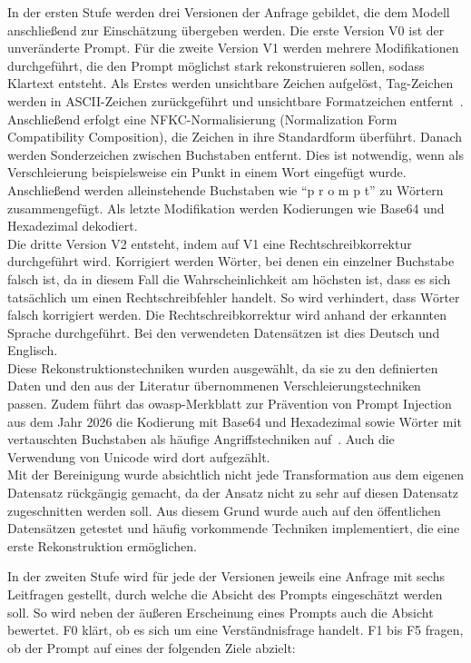 In der ersten Stufe werden drei Versionen der Anfrage gebildet, die dem Modell anschließend zur Einschätzung übergeben werden. Die erste Version V0 ist der
unveränderte Prompt. Für die zweite Version V1 werden mehrere Modifikationen durchgeführt, die den Prompt möglichst stark rekonstruieren sollen, sodass Klartext 
entsteht. Als Erstes werden unsichtbare Zeichen aufgelöst, Tag-Zeichen werden in ASCII-Zeichen zurückgeführt und unsichtbare Formatzeichen entfernt~\cite{sm42}.
Anschließend erfolgt eine NFKC-Normalisierung (Normalization Form Compatibility Composition), die Zeichen in ihre Standardform überführt. Danach werden Sonderzeichen zwischen
Buchstaben entfernt. Dies ist notwendig, wenn als Verschleierung beispielsweise ein Punkt in einem Wort eingefügt wurde. Anschließend werden alleinstehende
Buchstaben wie \enquote{p r o m p t} zu Wörtern zusammengefügt. Als letzte Modifikation werden Kodierungen wie Base64 und Hexadezimal dekodiert. \\
Die dritte Version V2 entsteht, indem auf V1 eine Rechtschreibkorrektur durchgeführt wird. Korrigiert werden Wörter, bei denen ein einzelner Buchstabe falsch ist, da
in diesem Fall die Wahrscheinlichkeit am höchsten ist, dass es sich tatsächlich um einen Rechtschreibfehler handelt. So wird verhindert, dass Wörter falsch korrigiert
werden. Die Rechtschreibkorrektur wird anhand der erkannten Sprache durchgeführt. Bei den verwendeten Datensätzen ist
dies Deutsch und Englisch. \\
Diese Rekonstruktionstechniken wurden ausgewählt, da sie zu den definierten Daten und den aus der Literatur übernommenen Verschleierungstechniken passen. Zudem 
führt das \ac{owasp}-Merkblatt zur Prävention von Prompt Injection aus dem Jahr 2026 die Kodierung mit Base64 und Hexadezimal sowie Wörter mit vertauschten Buchstaben
als häufige Angriffstechniken auf~\cite{sm42}. Auch die Verwendung von Unicode wird dort aufgezählt. \\
Mit der Bereinigung wurde absichtlich nicht jede Transformation aus dem eigenen Datensatz rückgängig gemacht, da der Ansatz nicht zu sehr auf diesen Datensatz
zugeschnitten werden soll. Aus diesem Grund wurde auch auf den öffentlichen Datensätzen getestet und häufig vorkommende Techniken implementiert, die eine
erste Rekonstruktion ermöglichen.\par\medskip
In der zweiten Stufe wird für jede der Versionen jeweils eine Anfrage mit sechs Leitfragen gestellt, durch welche die Absicht des Prompts eingeschätzt werden
soll. So wird neben der äußeren Erscheinung eines Prompts auch die Absicht bewertet. F0 klärt, ob es sich um eine Verständnisfrage handelt. F1 bis F5
fragen, ob der Prompt auf eines der folgenden Ziele abzielt:

